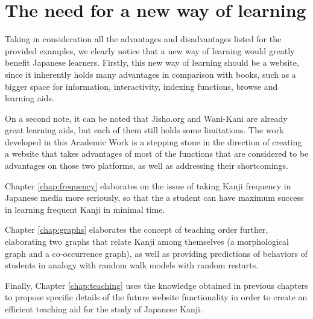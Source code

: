 \clearpage

\section{The need for a new way of learning}\label{intro:newway}

Taking in consideration all the advantages and disadvantages listed for the provided examples, we clearly notice that a new way of learning would greatly benefit Japanese learners. Firstly, this new way of learning should be a website, since it inherently holds many advantages in comparison with books, such as a bigger space for information, interactivity, indexing functions, browse and learning aids. 

On a second note, it can be noted that Jisho.org and Wani-Kani are already great learning aids, but each of them still holds some limitations. The work developed in this Academic Work is a stepping stone in the direction of creating a website that takes advantages of most of the functions that are considered to be advantages on those two platforms, as well as addressing their shortcomings.

Chapter \ref{chap:frequency} elaborates on the issue of taking Kanji frequency in Japanese media more seriously, so that the a student can have maximum success in learning frequent Kanji in minimal time.


Chapter \ref{chap:graphs} elaborates the concept of teaching order further, elaborating two graphs that relate Kanji among themselves (a morphological graph and a co-occurrence graph), as well as providing predictions of behaviors of students in analogy with random walk models with random restarts. 


Finally, Chapter \ref{chap:teaching} uses the knowledge obtained in previous chapters to propose specific details of the future website functionality in order to create an efficient teaching aid for the study of Japanese Kanji.